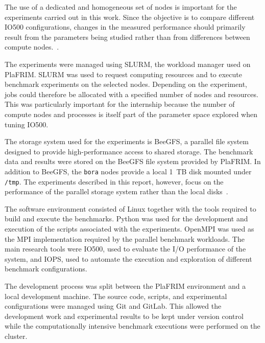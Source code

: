 The use of a dedicated and homogeneous set of nodes is important for the
experiments carried out in this work. Since the objective is to compare
different IO500 configurations, changes in the measured performance
should primarily result from the parameters being studied rather than
from differences between compute nodes.~\cite{plafrim}.

The experiments were managed using SLURM, the workload manager used on
PlaFRIM. SLURM was used to request computing resources and to execute
benchmark experiments on the selected nodes. Depending on the experiment,
jobs could therefore be allocated with a specified number of nodes and
resources. This was particularly important for the internship because
the number of compute nodes and processes is itself part of the parameter
space explored when tuning IO500.

The storage system used for the experiments is BeeGFS, a parallel file
system designed to provide high-performance access to shared storage.
The benchmark data and results were stored on the BeeGFS file system
provided by PlaFRIM.  In addition to BeeGFS, the \texttt{bora} nodes
provide a local 1~TB disk mounted under \texttt{/tmp}. The experiments
described in this report, however, focus on the performance of the
parallel storage system rather than the local disks~\cite{plafrim}. 

The software environment consisted of Linux together with the tools
required to build and execute the benchmarks. Python was used for
the development and execution of the scripts associated with the
experiments. OpenMPI was used as the MPI implementation required by the
parallel benchmark workloads. The main research tools were IO500, used
to evaluate the I/O performance of the system, and IOPS, used to automate
the execution and exploration of different benchmark configurations.

The development process was split between the PlaFRIM environment and a
local development machine. The source code, scripts, and experimental
configurations were managed using Git and GitLab. This allowed the
development work and experimental results to be kept under version
control while the computationally intensive benchmark executions were
performed on the cluster.




